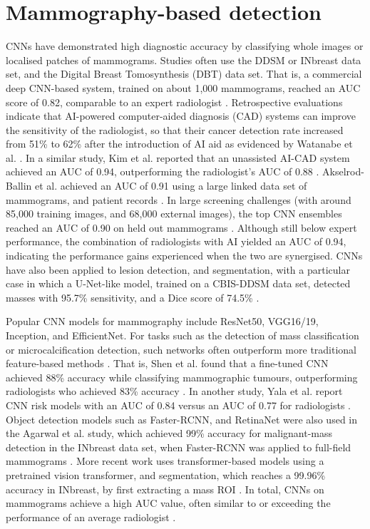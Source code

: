 \documentclass[../main]{subfiles}
\begin{document}
\section{Mammography-based detection}
\label{sec:mammography-cnn}
CNNs have demonstrated high diagnostic accuracy by classifying whole images or localised patches of mammograms. Studies often use the DDSM or INbreast data set, and the Digital Breast Tomosynthesis (DBT) data set. That is, a commercial deep CNN-based system, trained on about 1,000 mammograms, reached an AUC score of 0.82, comparable to an expert radiologist \autocite{carriero2024deep}. Retrospective evaluations indicate that AI-powered computer-aided diagnosis (CAD) systems can improve the sensitivity of the radiologist, so that their cancer detection rate increased from 51\% to 62\% after the introduction of AI aid as evidenced by Watanabe et al. \autocite{carriero2024deep}. In a similar study, Kim et al. reported that an unassisted AI-CAD system achieved an AUC of 0.94, outperforming the radiologist's AUC of 0.88 \autocite{carriero2024deep}. Akselrod-Ballin et al. achieved an AUC of 0.91 using a large linked data set of mammograms, and patient records \autocite{carriero2024deep}. In large screening challenges (with around 85,000 training images, and 68,000 external images), the top CNN ensembles reached an AUC of 0.90 on held out mammograms \autocite{carriero2024deep}. Although still below expert performance, the combination of radiologists with AI yielded an AUC of 0.94, indicating the performance gains experienced when the two are synergised. CNNs have also been applied to lesion detection, and segmentation, with a particular case in which a U-Net-like model, trained on a CBIS-DDSM data set, detected masses with 95.7\% sensitivity, and a Dice score of 74.5\% \autocite{jiang2024deep}.

Popular CNN models for mammography include ResNet50, VGG16/19, Inception, and EfficientNet. For tasks such as the detection of mass classification or microcalcification detection, such networks often outperform more traditional feature-based methods \autocite{wang2024mammography} \autocite{carriero2024deep}. That is, Shen et al. found that a fine-tuned CNN achieved 88\% accuracy while classifying mammographic tumours, outperforming radiologists who achieved 83\% accuracy \autocite{wang2024mammography}. In another study, Yala et al. report CNN risk models with an AUC of 0.84 versus an AUC of 0.77 for radiologists \autocite{wang2024mammography}. Object detection models such as Faster-RCNN, and RetinaNet were also used in the Agarwal et al. study, which achieved 99\% accuracy for malignant-mass detection in the INbreast data set, when Faster-RCNN was applied to full-field mammograms \autocite{jiang2024deep}. More recent work uses transformer-based models using a pretrained vision transformer, and segmentation, which reaches a 99.96\% accuracy in INbreast, by first extracting a mass ROI \autocite{kumar2024segmentation}. In total, CNNs on mammograms achieve a high AUC value, often similar to or exceeding the performance of an average radiologist \autocite{carriero2024deep}.
\end{document}
